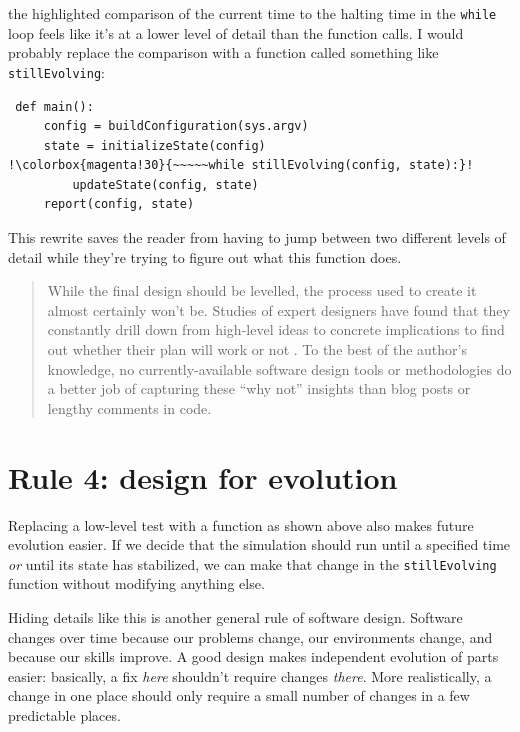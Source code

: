 \documentclass[10pt,letterpaper]{article}
\begin{document}
\noindent
the highlighted comparison of the current time to the halting time in the \texttt{while} loop
feels like it's at a lower level of detail than the function calls.
I would probably replace the comparison with a function called something like \texttt{stillEvolving}:

\begin{lstlisting}
 def main():
     config = buildConfiguration(sys.argv)
     state = initializeState(config)
!\colorbox{magenta!30}{~~~~~while stillEvolving(config, state):}!
         updateState(config, state)
     report(config, state)
\end{lstlisting}

\noindent
This rewrite saves the reader
from having to jump between two different levels of detail
while they're trying to figure out what this function does.

\begin{quotation}
  \noindent
  While the final design should be levelled,
  the process used to create it almost certainly won't be.
  Studies of expert designers have found that
  they constantly drill down from high-level ideas to concrete implications
  to find out whether their plan will work or not \cite{Schon1984}.
  To the best of the author's knowledge,
  no currently-available software design tools or methodologies do a better job of capturing these ``why not'' insights
  than blog posts or lengthy comments in code.
\end{quotation}

\section*{Rule 4: design for evolution}

Replacing a low-level test with a function as shown above also makes future evolution easier.
If we decide that the simulation should run until a specified time
\emph{or} until its state has stabilized,
we can make that change in the \texttt{stillEvolving} function
without modifying anything else.

Hiding details like this is another general rule of software design.
Software changes over time because our problems change,
our environments change,
and because our skills improve.
A good design makes independent evolution of parts easier:
basically,
a fix \emph{here} shouldn't require changes \emph{there}.
More realistically,
a change in one place should only require a small number of changes
in a few predictable places.
\end{document}
